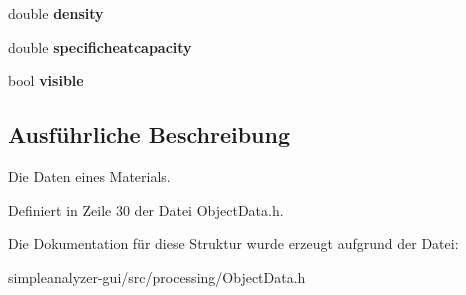 \begin{DoxyCompactItemize}
\item 
\hypertarget{structObjectData_1_1MaterialData_a49cbca11f42993f41497e725fe8ca68c}{double {\bfseries density}}\label{structObjectData_1_1MaterialData_a49cbca11f42993f41497e725fe8ca68c}

\item 
\hypertarget{structObjectData_1_1MaterialData_a784e2b70f98d146979fd422d41445fea}{double {\bfseries specificheatcapacity}}\label{structObjectData_1_1MaterialData_a784e2b70f98d146979fd422d41445fea}

\item 
\hypertarget{structObjectData_1_1MaterialData_a37980da11f6b51b30eb41c3ab4e9674a}{bool {\bfseries visible}}\label{structObjectData_1_1MaterialData_a37980da11f6b51b30eb41c3ab4e9674a}

\end{DoxyCompactItemize}


\subsection{Ausführliche Beschreibung}
Die Daten eines Materials. 

Definiert in Zeile 30 der Datei Object\-Data.\-h.



Die Dokumentation für diese Struktur wurde erzeugt aufgrund der Datei\-:\begin{DoxyCompactItemize}
\item 
simpleanalyzer-\/gui/src/processing/Object\-Data.\-h\end{DoxyCompactItemize}
